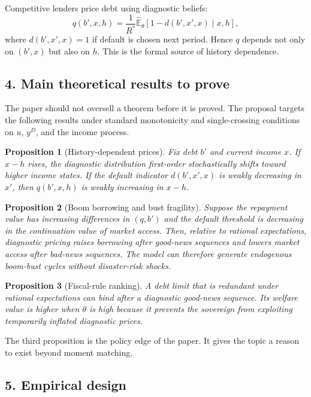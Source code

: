\documentclass[11pt]{article}
\newtheorem{proposition}{Proposition}
\newcommand{\E}{\mathbb{E}}
\begin{document}
Competitive lenders price debt using diagnostic beliefs:
\begin{equation}
q(b',x,h)=\frac{1}{R^*}\widehat{\E}_{\theta}\left[1-d(b',x',x)\mid x,h\right], \label{eq:price}
\end{equation}
where $d(b',x',x)=1$ if default is chosen next period. Hence $q$ depends not only on $(b',x)$ but also on $h$. This is the formal source of history dependence.

\subsection*{4. Main theoretical results to prove}
The paper should not oversell a theorem before it is proved. The proposal targets the following results under standard monotonicity and single-crossing conditions on $u$, $y^D$, and the income process.

\begin{proposition}[History-dependent prices]
Fix debt $b'$ and current income $x$. If $x-h$ rises, the diagnostic distribution first-order stochastically shifts toward higher income states. If the default indicator $d(b',x',x)$ is weakly decreasing in $x'$, then $q(b',x,h)$ is weakly increasing in $x-h$.
\end{proposition}

\begin{proposition}[Boom borrowing and bust fragility]
Suppose the repayment value has increasing differences in $(q,b')$ and the default threshold is decreasing in the continuation value of market access. Then, relative to rational expectations, diagnostic pricing raises borrowing after good-news sequences and lowers market access after bad-news sequences. The model can therefore generate endogenous boom-bust cycles without disaster-risk shocks.
\end{proposition}

\begin{proposition}[Fiscal-rule ranking]
A debt limit that is redundant under rational expectations can bind after a diagnostic good-news sequence. Its welfare value is higher when $\theta$ is high because it prevents the sovereign from exploiting temporarily inflated diagnostic prices.
\end{proposition}

The third proposition is the policy edge of the paper. It gives the topic a reason to exist beyond moment matching.

\subsection*{5. Empirical design}
\end{document}
